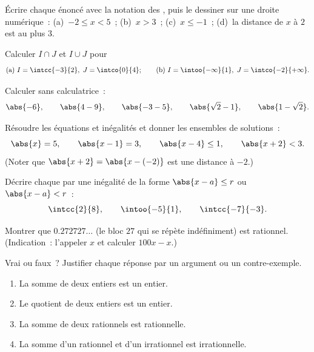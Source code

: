 \begin{exercise}[$\star$]\label{exo:g10:numbers:2}
Écrire chaque énoncé avec la notation des , puis le
dessiner sur une droite numérique~: (a)~$-2 \leq x < 5$~;
(b)~$x > 3$~; (c)~$x \leq -1$~; (d)~la distance de $x$ à $2$ est au
plus $3$.
\end{exercise}

\begin{exercise}[$\star$]\label{exo:g10:numbers:3}
Calculer $I \cap J$ et $I \cup J$ pour
\[
\text{(a) } I = \intcc{-3}{2},\ J = \intco{0}{4};
\qquad
\text{(b) } I = \intoo{-\infty}{1},\ J = \intco{-2}{+\infty}.
\]
\end{exercise}

\begin{exercise}[$\star$]\label{exo:g10:numbers:4}
Calculer sans calculatrice~:
\[
\abs{-6}, \qquad \abs{4 - 9}, \qquad \abs{-3 - 5}, \qquad
\abs{\sqrt 2 - 1}, \qquad \abs{1 - \sqrt 2}.
\]
\end{exercise}

\begin{exercise}[$\star$]\label{exo:g10:numbers:5}
Résoudre les équations et inégalités et donner les ensembles de
solutions~:
\[
\abs{x} = 5, \qquad \abs{x - 1} = 3, \qquad \abs{x - 4} \leq 1, \qquad
\abs{x + 2} < 3 .
\]
(Noter que $\abs{x+2} = \abs{x - (-2)}$ est une distance à $-2$.)
\end{exercise}

\begin{exercise}[$\star\star$]\label{exo:g10:numbers:6}
Décrire chaque  par une inégalité de la forme
$\abs{x - a} \leq r$ ou $\abs{x - a} < r$~:
\[
\intcc{2}{8}, \qquad \intoo{-5}{1}, \qquad \intcc{-7}{-3}.
\]
\end{exercise}

\begin{exercise}[$\star\star$]\label{exo:g10:numbers:7}
Montrer que $0.272727\dots$ (le bloc $27$ qui se répète indéfiniment)
est rationnel. (Indication~: l'appeler $x$ et calculer $100x - x$.)
\end{exercise}

\begin{exercise}[$\star\star$]\label{exo:g10:numbers:8}
Vrai ou faux~? Justifier chaque réponse par un argument ou un
contre-exemple.
\begin{enumerate}
  \item La somme de deux entiers est un entier.
  \item Le quotient de deux entiers est un entier.
  \item La somme de deux rationnels est rationnelle.
  \item La somme d'un rationnel et d'un irrationnel est irrationnelle.
\end{enumerate}
\end{exercise}

